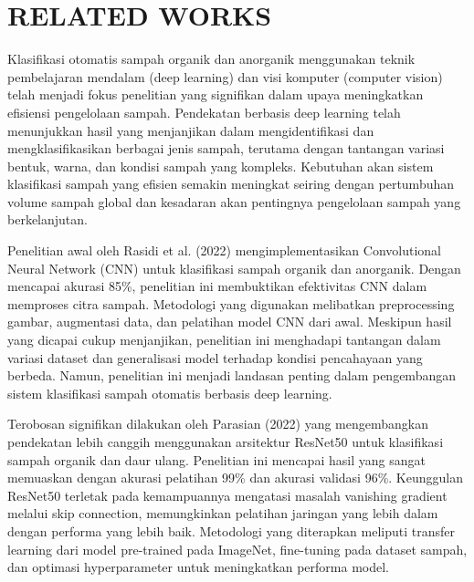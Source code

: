 \documentclass[12pt,a4paper]{article}
\begin{document}
\section{RELATED WORKS}
\begin{adjustwidth}{3em}{0pt}

\hspace{0.5cm} Klasifikasi otomatis sampah organik dan anorganik menggunakan teknik pembelajaran mendalam (deep learning) dan visi komputer (computer vision) telah menjadi fokus penelitian yang signifikan dalam upaya meningkatkan efisiensi pengelolaan sampah. Pendekatan berbasis deep learning telah menunjukkan hasil yang menjanjikan dalam mengidentifikasi dan mengklasifikasikan berbagai jenis sampah, terutama dengan tantangan variasi bentuk, warna, dan kondisi sampah yang kompleks. Kebutuhan akan sistem klasifikasi sampah yang efisien semakin meningkat seiring dengan pertumbuhan volume sampah global dan kesadaran akan pentingnya pengelolaan sampah yang berkelanjutan.

\vspace{1em}
\hspace{0.5cm} Penelitian awal oleh Rasidi et al. (2022) mengimplementasikan Convolutional Neural Network (CNN) untuk klasifikasi sampah organik dan anorganik. Dengan mencapai akurasi 85\%, penelitian ini membuktikan efektivitas CNN dalam memproses citra sampah. Metodologi yang digunakan melibatkan preprocessing gambar, augmentasi data, dan pelatihan model CNN dari awal. Meskipun hasil yang dicapai cukup menjanjikan, penelitian ini menghadapi tantangan dalam variasi dataset dan generalisasi model terhadap kondisi pencahayaan yang berbeda. Namun, penelitian ini menjadi landasan penting dalam pengembangan sistem klasifikasi sampah otomatis berbasis deep learning.

\vspace{1em}
\hspace{0.5cm} Terobosan signifikan dilakukan oleh Parasian (2022) yang mengembangkan pendekatan lebih canggih menggunakan arsitektur ResNet50 untuk klasifikasi sampah organik dan daur ulang. Penelitian ini mencapai hasil yang sangat memuaskan dengan akurasi pelatihan 99\% dan akurasi validasi 96\%. Keunggulan ResNet50 terletak pada kemampuannya mengatasi masalah vanishing gradient melalui skip connection, memungkinkan pelatihan jaringan yang lebih dalam dengan performa yang lebih baik. Metodologi yang diterapkan meliputi transfer learning dari model pre-trained pada ImageNet, fine-tuning pada dataset sampah, dan optimasi hyperparameter untuk meningkatkan performa model.


\end{adjustwidth}
\end{document}
